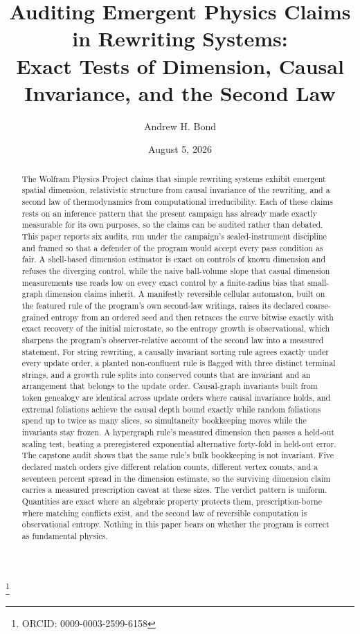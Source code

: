 \documentclass[aps,pre,reprint,nofootinbib]{revtex4-2}
\begin{document}
\title{Auditing Emergent Physics Claims in Rewriting Systems:\\
Exact Tests of Dimension, Causal Invariance, and the Second Law}

\author{Andrew H. Bond}
\thanks{ORCID: 0009-0003-2599-6158}
\date{August 5, 2026}

\begin{abstract}
The Wolfram Physics Project claims that simple rewriting systems
exhibit emergent spatial dimension, relativistic structure from causal
invariance of the rewriting, and a second law of thermodynamics from
computational irreducibility.  Each of these claims rests on an
inference pattern that the present campaign has already made exactly
measurable for its own purposes, so the claims can be audited rather
than debated.  This paper reports six audits, run under the campaign's
sealed-instrument discipline and framed so that a defender of the
program would accept every pass condition as fair.  A shell-based
dimension estimator is exact on controls of known dimension and
refuses the diverging control, while the naive ball-volume slope that
casual dimension measurements use reads low on every exact control by
a finite-radius bias that small-graph dimension claims inherit.  A
manifestly reversible cellular automaton, built on the featured rule
of the program's own second-law writings, raises its declared
coarse-grained entropy from an ordered seed and then retraces the
curve bitwise exactly with exact recovery of the initial microstate,
so the entropy growth is observational, which sharpens the program's
observer-relative account of the second law into a measured statement.
For string rewriting, a causally invariant sorting rule agrees exactly
under every update order, a planted non-confluent rule is flagged with
three distinct terminal strings, and a growth rule splits into
conserved counts that are invariant and an arrangement that belongs to
the update order.  Causal-graph invariants built from token genealogy
are identical across update orders where causal invariance holds, and
extremal foliations achieve the causal depth bound exactly while
random foliations spend up to twice as many slices, so simultaneity
bookkeeping moves while the invariants stay frozen.  A hypergraph
rule's measured dimension then passes a held-out scaling test, beating
a preregistered exponential alternative forty-fold in held-out error.
The capstone audit shows that the same rule's bulk bookkeeping is not
invariant.  Five declared match orders give different relation counts,
different vertex counts, and a seventeen percent spread in the
dimension estimate, so the surviving dimension claim carries a
measured prescription caveat at these sizes.  The verdict pattern is
uniform.  Quantities are exact where an algebraic property protects
them, prescription-borne where matching conflicts exist, and the
second law of reversible computation is observational entropy.
Nothing in this paper bears on whether the program is correct as
fundamental physics.
\end{abstract}
\end{document}
